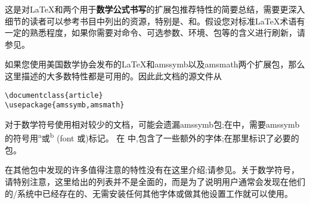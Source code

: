 这是对\LaTeX{}和两个用于\textbf{数学公式书写}的扩展包推荐特性的简要总结，需要更深入细节的读者可以参考书目中列出的资源，特别是\cite{lamport}、\cite{amsldoc}和\cite{fntguide}。假设您对标准\LaTeX{}术语有一定的熟悉程度，如果你需要对命令、可选参数、环境、包等的含义进行刷新，请参见\cite{lamport}。

如果您使用美国数学协会发布的\LaTeX{}和amssymb以及amsmath两个扩展包，那么这里描述的大多数特性都是可用的。因此此文档的源文件从
\begin{verbatim}
\documentclass{article}
\usepackage{amssymb,amsmath}
\end{verbatim}

对于数学符号使用相对较少的文档，可能会遗漏amssymb包;在中，需要amssymb的符号用\textsuperscript{a}或\textsuperscript{b} (font 或)标记。 在 中,包含了一些额外的字体;在那里标识了必要的包。

在其他包中发现的许多值得注意的特性没有在这里介绍;请参见。关于数学符号，请特别注意，这里给出的列表并不是全面的，而是为了说明用户通常会发现在他们的\lat/系统中已经存在的、无需安装任何其他字体或做其他设置工作就可以使用。


